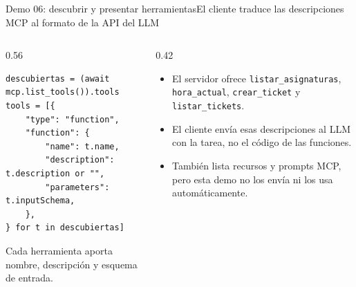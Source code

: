 \begin{frame}[fragile]{Demo 06: descubrir y presentar herramientas}{El cliente traduce las descripciones MCP al formato de la API del LLM}
	\begin{columns}[T]
		\begin{column}{0.56\textwidth}
			\begin{lstlisting}
descubiertas = (await mcp.list_tools()).tools
tools = [{
    "type": "function",
    "function": {
        "name": t.name,
        "description": t.description or "",
        "parameters": t.inputSchema,
    },
} for t in descubiertas]
\end{lstlisting}
			{\scriptsize Cada herramienta aporta nombre, descripción y esquema de entrada.}
		\end{column}
		\begin{column}{0.42\textwidth}
			\footnotesize
			\begin{itemize}
				\setlength{\itemsep}{1pt}
				\item El servidor ofrece \texttt{listar\_asignaturas}, \texttt{hora\_actual}, \texttt{crear\_ticket} y \texttt{listar\_tickets}.
				\item El cliente envía esas descripciones al LLM con la tarea, no el código de las funciones.
				\item También lista recursos y prompts MCP, pero esta demo no los envía ni los usa automáticamente.
			\end{itemize}
		\end{column}
	\end{columns}
\end{frame}

